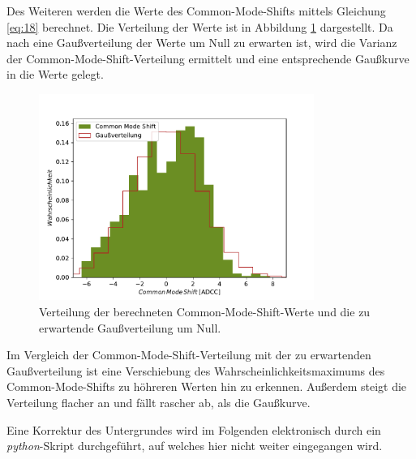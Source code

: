 Des Weiteren werden die Werte des Common-Mode-Shifts mittels Gleichung \eqref{eq:18} berechnet. Die Verteilung der Werte ist in Abbildung \ref{fig:CommonModeShift} dargestellt. Da nach \cite{anleitung} eine Gaußverteilung der Werte um Null zu erwarten ist, wird die Varianz der Common-Mode-Shift-Verteilung ermittelt und eine entsprechende Gaußkurve in die Werte gelegt.
\begin{figure}
  \centering
  \includegraphics[width=0.8\textwidth]{plots/CommonModeShift.pdf}
  \caption{Verteilung der berechneten Common-Mode-Shift-Werte und die zu erwartende Gaußverteilung um Null.}
  \label{fig:CommonModeShift}
\end{figure}
\FloatBarrier
Im Vergleich der Common-Mode-Shift-Verteilung mit der zu erwartenden Gaußverteilung ist eine Verschiebung des Wahrscheinlichkeitsmaximums des Common-Mode-Shifts zu höhreren Werten hin zu erkennen. Außerdem steigt die Verteilung flacher an und fällt rascher ab, als die Gaußkurve.

Eine Korrektur des Untergrundes wird im Folgenden elektronisch durch ein \textit{python}-Skript durchgeführt, auf welches hier nicht weiter eingegangen wird.

